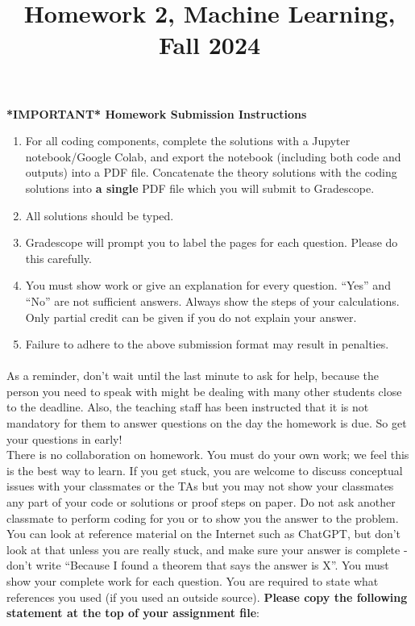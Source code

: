 \documentclass{exam}
\title{Homework 2, Machine Learning, Fall 2024}
\author{ }
\date{}
\begin{document}
\maketitle
\textbf{*IMPORTANT* Homework Submission Instructions}
\begin{enumerate}
    \item For all coding components, complete the solutions with a Jupyter notebook/Google Colab, and export the notebook (including both code and outputs) into a PDF file. Concatenate the theory solutions with the coding solutions into \textbf{a single} PDF file which you will submit to Gradescope. 
    \item All solutions should be typed. 
    \item Gradescope will prompt you to label the pages for each question. Please do this carefully. 
    \item You must show work or give an explanation for every question. ``Yes'' and ``No'' are not sufficient answers. Always show the steps of your calculations. Only partial credit can be given if you do not explain your answer.
    \item Failure to adhere to the above submission format may result in penalties.  
\end{enumerate}


\paragraph{} As a reminder, don’t wait until the last minute to ask for help, because the person you need to speak with might be dealing with many other students close to the deadline. Also, the teaching staff has been instructed that it is not mandatory for them to answer questions on the day the homework is due. So get your questions in early! \\

There is no collaboration on homework. You must do your own work; we feel this is the best way to learn. If you get stuck, you are welcome to discuss conceptual issues with your classmates or the TAs but you may not show your classmates any part of your code or solutions or proof steps on paper. Do not ask another classmate to perform coding for you or to show you the answer to the problem. You can look at reference material on the Internet such as ChatGPT, but don’t look at that unless you are really stuck, and make sure your answer is complete - don’t write “Because I found a theorem that says the answer is X”. You must show your complete work for each question. You are required to state what references you used (if you used an outside source). \textbf{Please copy the following statement at the top of your assignment file}: \\
\end{document}
